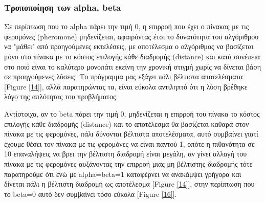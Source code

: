 \subsubsection{Τροποποίηση των alpha, beta}

Σε περίπτωση που το alpha πάρει την τιμή 0, η επιρροή που έχει ο πίνακας με τις φερομόνες (pheromone) μηδενίζεται, αφαιρόντας έτσι το δυνατότητα του αλγόριθμου να "μάθει" από προηγούμενες εκτελέσεις, με αποτέλεσμα ο αλγόριθμος να βασίζεται μόνο στο πίνακα με το κόστος επιλογής κάθε διαδρομής (distance) και κατά συνέπεια στο ποιό είναι το καλύτερο μονοπάτι εκείνη την χρονική στιγμή χωρίς να δίνεται βάση σε προηγούμενες λύσεις. Το πρόγραμμα μας εξάγει πάλι βέλτιστα αποτελέσματα [Figure \ref{14}], αλλά παρατηρώντας τα, είναι εύκολα αντιληπτό ότι η λύση βρέθηκε λόγο της απλότητας του προβλήματος. 

Αντίστοιχα, αν το beta πάρει την τιμή 0, μηδενίζεται η επιρροή του πίνακα το κόστος επιλογής κάθε διαδρομής (distance) και το αποτέλεσμα θα βασίζεται καθαρά στον πίνακα με τις φερομόνες, πάλι δύνονται βέλτιστα αποτελέσματα, αυτό συμβαίνει γιατί έχουμε θέσει τον πίνακα με τις φερομόνες να είναι παντού 1, οπότε η πιθανότητα σε 10 επαναλήψεις να βρει την βέλτιστη διαδρομή είναι μεγάλη, αν γίνει αλλαγή του πίνακα με τις φερομόνες αυξάνοντας την επιρροή μιας μη βέλτιστης διαδρομής τότε παρατηρούμε ότι ενώ με alpha=beta=1 καταφέρνει να ανακάμψει γρήγορα και δίνεται πάλι η βέλτιστη διαδρομή ως αποτέλεσμα [Figure \ref{14}], στην περίπτωση που το beta=0 αυτό δεν συμβαίνει τόσο εύκολα [Figure \ref{16}].

